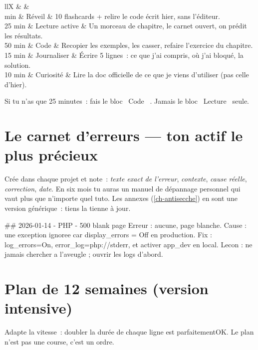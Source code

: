 \begin{tabz}{llX}
  \headrow {} \&  \&  \\
   min \& R\'eveil \& 10 flashcards + relire le code \'ecrit hier, sans l'\'editeur. \\
  25 min \& Lecture active \& Un morceau de chapitre, le carnet ouvert, on pr\'edit les r\'esultats. \\
  50 min \& Code \& Recopier les exemples, les casser, refaire l'exercice du chapitre. \\
  15 min \& Journaliser \& \'Ecrire 5 lignes~: ce que j'ai compris, o\`u j'ai bloqu\'e, la solution. \\
  10 min \& Curiosit\'e \& Lire la doc officielle de ce que je viens d'utiliser (pas celle d'hier). \\
\end{tabz}

Si tu n'as que 25 minutes~: fais le bloc \og ~Code~ \fg{}. Jamais le bloc \og ~Lecture~ \fg{} seule.

\section{Le carnet d'erreurs --- ton actif le plus pr\'ecieux}

Cr\'ee  dans chaque projet et note~: \emph{texte exact de l'erreur},
\emph{contexte}, \emph{cause r\'eelle}, \emph{correction}, \emph{date}. En six mois tu auras un
manuel de d\'epannage personnel qui vaut plus que n'importe quel tuto. Les annexes
(\cref{ch-antisecche}) en sont une version g\'en\'erique~: tiens la tienne \`a jour.

\begin{codeconf}
## 2026-01-14 - PHP - 500 blank page
Erreur : aucune, page blanche.
Cause : une exception ignoree car display_errors = Off en production.
Fix : log_errors=On, error_log=php://stderr, et activer app_dev en local.
Lecon : ne jamais chercher a l'aveugle ; ouvrir les logs d'abord.
\end{codeconf}

\section{Plan de 12 semaines (version intensive)}

Adapte la vitesse~: doubler la dur\'ee de chaque ligne est parfaitementOK. Le plan n'est pas
une course, c'est un ordre.

